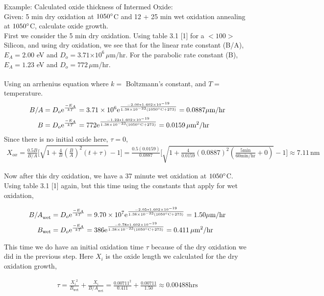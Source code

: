 \documentclass{article}
\newcommand{\me}{\mathrm{e}}
\providecommand{\e}[1]{\ensuremath{\times 10^{#1}}}
\begin{document}
Example: Calculated oxide thickness of Intermed Oxide: \\
Given: 5 min dry oxidation at $1050\degree$C and 12 + 25 min wet oxidation annealing at $1050\degree$C, calculate oxide growth. \\

First we consider the 5 min dry oxidation. Using table 3.1 [1] for a $<100>$ Silicon, and using dry oxidation, we see that for the linear rate constant (B/A), $E_A = 2.00$ eV and $D_o = 3.71\e{6} \, \mu$m/hr. For the parabolic rate constant (B), $E_A = 1.23$ eV and $D_o = 772\, \mu$m/hr. \\ \\
Using an arrhenius equation where $k =$ Boltzmann's constant, and $T = $ temperature. 
\begin{align*}
B/A &= D_o\me^{\frac{-E_A}{kT}} = 3.71\e{6}\me^{\frac{-2.00*1.602\e{-19}}{1.38\e{-23}(1050\degree\text{C} + 273)}} = 0.0887 \mu\text{m/hr} \\
B &= D_o\me^{\frac{-E_A}{kT}} = 772\me^{\frac{-1.23*1.602\e{-19}}{1.38\e{-23}(1050\degree\text{C} + 273)}} = 0.0159 \,{\mu\text{m}}^2\text{/hr}
\end{align*}
Since there is no initial oxide here, $\tau = 0$,
\begin{align*}
X_{ox} = \frac{0.5B}{B/A}\Big[\sqrt{1 + \frac{4}{B}(\frac{B}{A})^2(t + \tau)} - 1\Big] = \frac{0.5 (0.0159)}{0.0887}\Big[\sqrt{1 + \frac{4}{0.0159}(0.0887)^2(\frac{5\text{min}}{60\text{min/hr}} + 0)} - 1\Big] \approx 7.11 \, \text{nm}
\end{align*}

Now after this dry oxidation, we have a 37 minute wet oxidation at $1050 \degree$C. Using table 3.1 [1] again, but this time using the constants that apply for wet oxidation,

\begin{align*}
{B/A}_{\text{wet}} &= D_o\me^{\frac{-E_A}{kT}} = 9.70\e{7}\me^{\frac{-2.05*1.602\e{-19}}{1.38\e{-23}(1050\degree\text{C} + 273)}} = 1.50 \mu\text{m/hr} \\
B_{\text{wet}} &= D_o\me^{\frac{-E_A}{kT}} = 386\me^{\frac{-0.78*1.602\e{-19}}{1.38\e{-23}(1050\degree\text{C} + 273)}} = 0.411 \,{\mu\text{m}}^2\text{/hr}
\end{align*}

This time we do have an initial oxidation time $\tau$ because of the dry oxidation we did in the previous step. Here $X_i$ is the oxide length we calculated for the dry oxidation growth,

\begin{align*}
\tau = \frac{{X_i}^2}{B_{\text{wet}}} + \frac{X_i}{{B/A}_{\text{wet}}} = \frac{0.00711^2}{0.411} + \frac{0.00711}{1.50} \approx 0.00488 \text{hrs}
\end{align*}
\end{document}
